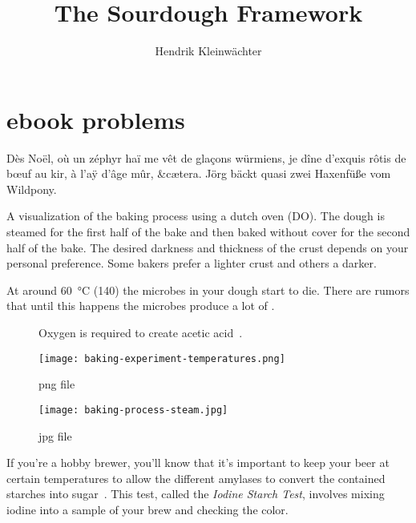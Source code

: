 \documentclass[paper=a4, twoside=false, fontsize=12pt, parskip=half,
                bibliography=totoc, listof=totoc]{scrbook}
\author{Hendrik Kleinwächter}
\title{The Sourdough Framework}
\begin{document}

\titlepage

{%
\hypersetup{hidelinks}
\ifdefined\HCode\else\tableofcontents\fi
}

\chapter{ebook problems}
Dès Noël, où un zéphyr haï me vêt de glaçons würmiens, je dîne d’exquis rôtis
de bœuf au kir, à l’aÿ d’âge mûr, \&cætera.
Jörg bäckt quasi zwei Haxenfüße vom Wildpony.

\begin{flowchart}[!htb]
\begin{center}
  
  \caption[Baking process with a dutch oven]{A visualization of the baking
      process using a dutch oven (DO). The dough is steamed for the first half
      of the bake and then baked without cover for the second half of the
      bake. The desired darkness and thickness of the crust depends on your
      personal preference. Some bakers prefer a lighter crust and others a
      darker.}%
  \label{fig:dutch-oven-process}
\end{center}
\end{flowchart}

At around  \qty{60}{\degreeCelsius} (\qty{140}{\degF}) the microbes in your
dough start to die.  There are rumors that until this happens the microbes
produce a lot of .

\begin{figure}[!htb]
\begin{center}
  
  \caption[Acetic acid creation]{Oxygen is required to create acetic
      acid~\cite{acetic+acid+production}.}%
  \label{fig:ethanol-oxidation}
\end{center}

\end{figure}

\begin{figure}[!htb]
  \texttt{[image: baking-experiment-temperatures.png]}
  \caption[Surface temperature for different steaming methods]{png file}
\end{figure}

\begin{figure}[!htb]
  \texttt{[image: baking-process-steam.jpg]}
  \caption[Steam building with inverted tray]{jpg file}%
      \label{flc:inverted-tray}
\end{figure}
If you're a hobby brewer, you'll know that it's important to keep your beer at
certain temperatures to allow the different amylases to convert the contained
starches into sugar~\cite{beer+amylase}.
This test, called the \emph{Iodine Starch Test}, involves mixing iodine into
a sample of your brew and checking the color.
\end{document}
